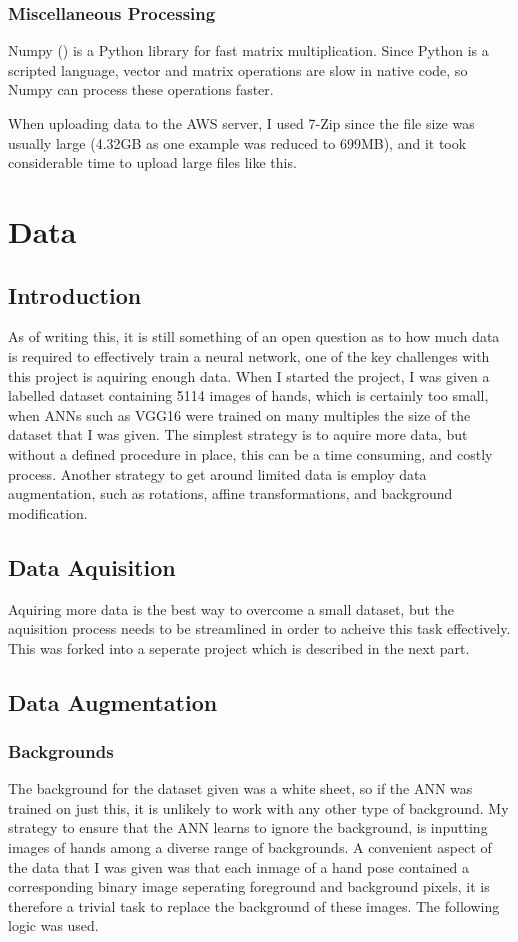         \subsubsection{Miscellaneous Processing}
        Numpy (\cite{5725236}) is a Python library for fast matrix multiplication. Since Python is a scripted language, vector and matrix operations are slow in native code, so Numpy can process these operations faster.

        When uploading data to the AWS server, I used 7-Zip since the file size was usually large (4.32GB as one example was reduced to 699MB), and it took considerable time to upload large files like this.


\section{Data}
    \subsection{Introduction}
    As of writing this, it is still something of an open question as to how much data is required to effectively train a neural network, one of the key challenges with this project is aquiring enough data. When I started the project, I was given a labelled dataset containing 5114 images of hands, which is certainly too small, when ANNs such as VGG16 \cite{vggnet} were trained on many multiples the size of the dataset that I was given. The simplest strategy is to aquire more data, but without a defined procedure in place, this can be a time consuming, and costly process. Another strategy to get around limited data is employ data augmentation, such as rotations, affine transformations, and background modification.

    \subsection{Data Aquisition}
    Aquiring more data is the best way to overcome a small dataset, but the aquisition process needs to be streamlined in order to acheive this task effectively. This was forked into a seperate project which is described in the next part.

    \subsection{Data Augmentation}
        \subsubsection{Backgrounds}
        The background for the dataset given was a white sheet, so if the ANN was trained on just this, it is unlikely to work with any other type of background. My strategy to ensure that the ANN learns to ignore the background, is inputting images of hands among a diverse range of backgrounds. A convenient aspect of the data that I was given was that each inmage of a hand pose contained a corresponding binary image seperating foreground and background pixels, it is therefore a trivial task to replace the background of these images. The following logic was used.

